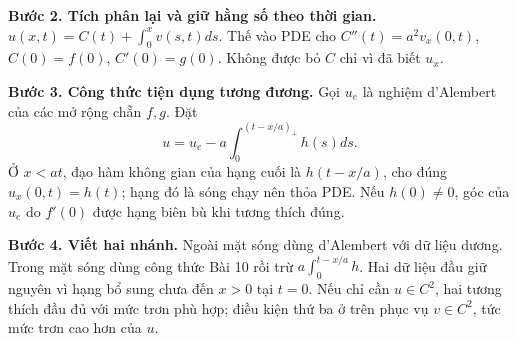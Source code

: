 \documentclass[10pt,a4paper]{article}
\begin{document}
\textbf{Bước 2. Tích phân lại và giữ hằng số theo thời gian.} $u(x,t)=C(t)+\int_0^xv(s,t)ds$. Thế vào PDE cho $C''(t)=a^2v_x(0,t)$, $C(0)=f(0)$, $C'(0)=g(0)$. Không được bỏ $C$ chỉ vì đã biết $u_x$.

\textbf{Bước 3. Công thức tiện dụng tương đương.} Gọi $u_e$ là nghiệm d'Alembert của các mở rộng chẵn $f,g$. Đặt
\[u=u_e-a\int_0^{(t-x/a)_+}h(s)ds.\]
Ở $x<at$, đạo hàm không gian của hạng cuối là $h(t-x/a)$, cho đúng $u_x(0,t)=h(t)$; hạng đó là sóng chạy nên thỏa PDE. Nếu $h(0)\ne0$, góc của $u_e$ do $f'(0)$ được hạng biên bù khi tương thích đúng.

\textbf{Bước 4. Viết hai nhánh.} Ngoài mặt sóng dùng d'Alembert với dữ liệu dương. Trong mặt sóng dùng công thức Bài 10 rồi trừ $a\int_0^{t-x/a}h$. Hai dữ liệu đầu giữ nguyên vì hạng bổ sung chưa đến $x>0$ tại $t=0$. Nếu chỉ cần $u\in C^2$, hai tương thích đầu đủ với mức trơn phù hợp; điều kiện thứ ba ở trên phục vụ $v\in C^2$, tức mức trơn cao hơn của $u$.
\end{document}
